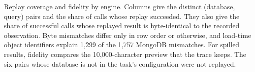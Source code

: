 \begin{table}[htbp]
  \caption{Replay coverage and fidelity by engine. Columns give the distinct (database, query) pairs and the share of calls
  whose replay succeeded. They also give the share of successful calls whose replayed result is byte-identical to
  the recorded observation. Byte mismatches differ only in row order or otherwise, and load-time object identifiers
  explain 1,299 of the 1,757 MongoDB mismatches. For spilled results, fidelity compares the 10,000-character preview that the trace keeps.
  The six pairs whose database is not in the task's configuration were not replayed.}
  \label{tab:workload}
  \small\setlength{\tabcolsep}{2.6pt}
  
\end{table}
